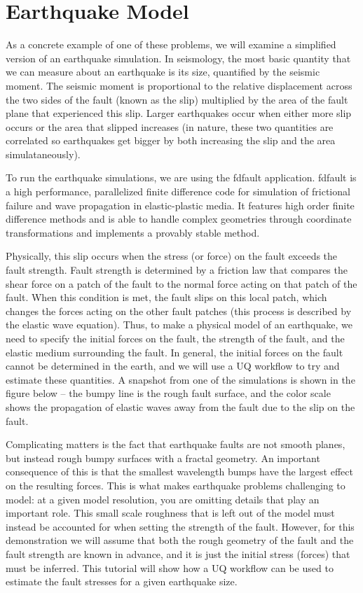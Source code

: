 \documentclass[openacc]{rstransa}%
\begin{document}
\section{Earthquake Model}

As a concrete example of one of these problems, we will examine a simplified version of an earthquake simulation. In seismology, the most basic quantity that we can measure about an earthquake is its size, quantified by the seismic moment. The seismic moment is proportional to the relative displacement across the two sides of the fault (known as the slip) multiplied by the area of the fault plane that experienced this slip. Larger earthquakes occur when either more slip occurs or the area that slipped increases (in nature, these two quantities are correlated so earthquakes get bigger by both increasing the slip and the area simulataneously).

To run the earthquake simulations, we are using the fdfault application. fdfault is a high performance, parallelized finite difference code for simulation of frictional failure and wave propagation in elastic-plastic media. It features high order finite difference methods and is able to handle complex geometries through coordinate transformations and implements a provably stable method.

Physically, this slip occurs when the stress (or force) on the fault exceeds the fault strength. Fault strength is determined by a friction law that compares the shear force on a patch of the fault to the normal force acting on that patch of the fault. When this condition is met, the fault slips on this local patch, which changes the forces acting on the other fault patches (this process is described by the elastic wave equation). Thus, to make a physical model of an earthquake, we need to specify the initial forces on the fault, the strength of the fault, and the elastic medium surrounding the fault. In general, the initial forces on the fault cannot be determined in the earth, and we will use a UQ workflow to try and estimate these quantities. A snapshot from one of the simulations is shown in the figure below -- the bumpy line is the rough fault surface, and the color scale shows the propagation of elastic waves away from the fault due to the slip on the fault.

Complicating matters is the fact that earthquake faults are not smooth planes, but instead rough bumpy surfaces with a fractal geometry. An important consequence of this is that the smallest wavelength bumps have the largest effect on the resulting forces. This is what makes earthquake problems challenging to model: at a given model resolution, you are omitting details that play an important role. This small scale roughness that is left out of the model must instead be accounted for when setting the strength of the fault. However, for this demonstration we will assume that both the rough geometry of the fault and the fault strength are known in advance, and it is just the initial stress (forces) that must be inferred. This tutorial will show how a UQ workflow can be used to estimate the fault stresses for a given earthquake size.
\end{document}
